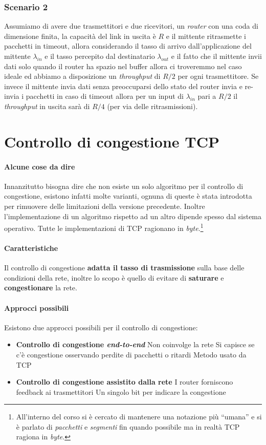         \subsubsection{Scenario 2}
            Assumiamo di avere due trasmettitori e due ricevitori, un \textit{router} con una coda di dimensione finita, la capacità del link in uscita è $ R $ e il mittente ritrasmette i pacchetti in timeout, allora considerando il tasso di arrivo dall'applicazione del mittente $\lambda_{in}$ e il tasso percepito dal destinatario $\lambda_{out}$ e il fatto che il mittente invii dati solo quando il router ha spazio nel buffer allora ci troveremmo nel caso ideale ed abbiamo a disposizione un \textit{throughput} di $ R/2 $ per ogni trasmettitore. Se invece il mittente invia dati senza preoccuparsi dello stato del router invia e re-invia i pacchetti in caso di timeout allora per un input di $\lambda_{in}$ pari a $ R/2 $ il \textit{throughput} in uscita sarà di $ R/4 $ (per via delle ritrasmissioni).
\section[Controllo di congestione \texttt{TCP}]{Controllo di congestione \Acrshort*{TCP}}
    \paragraph{Alcune cose da dire} Innanzitutto bisogna dire che non esiste un solo algoritmo per il controllo di congestione, esistono infatti molte varianti, ognuna di queste è stata introdotta per rimuovere delle limitazioni della versione precedente. Inoltre l'implementazione di un algoritmo rispetto ad un altro dipende spesso dal sistema operativo. Tutte le implementazioni di \Acrshort*{TCP} ragionano in \textit{byte}.\footnote{All'interno del corso si è cercato di mantenere una notazione più ``umana'' e si è parlato di \textit{pacchetti} e \textit{segmenti} fin quando possibile ma in realtà \Acrshort*{TCP} ragiona in \textit{byte}.}
    \paragraph{Caratteristiche} Il controllo di congestione \textbf{adatta il tasso di trasmissione} sulla base delle condizioni della rete, inoltre lo scopo è quello di evitare di \textbf{saturare} e \textbf{congestionare} la rete. 
    \paragraph{Approcci possibili} Esistono due approcci possibili per il controllo di congestione: \begin{itemize}
        \item \textbf{Controllo di congestione \textit{end-to-end}} 
            \subitem Non coinvolge la rete
            \subitem Si capisce se c'è congestione osservando perdite di pacchetti o ritardi
            \subitem Metodo usato da \Acrshort*{TCP}
        \item \textbf{Controllo di congestione assistito dalla rete}
            \subitem I router forniscono feedback ai trasmettitori
            \subitem Un singolo bit per indicare la congestione
    \end{itemize}
